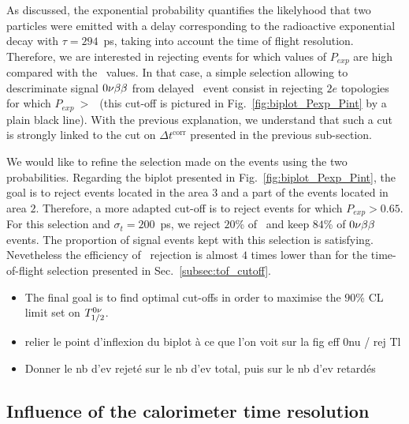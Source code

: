 As discussed, the exponential probability quantifies the likelyhood that two particles were emitted with a delay corresponding to the radioactive exponential decay with ${\tau=294}$~ps, taking into account the time of flight resolution.
Therefore, we are interested in rejecting events for which values of $P_{exp}$ are high compared with the \Pint\ values.
In that case, a simple selection allowing to descriminate signal $0\nu\beta\beta$ from delayed \Tl\ event consist in rejecting $2e$ topologies for which $P_{exp}~>~$\Pint\ (this cut-off is pictured in Fig.~\ref{fig:biplot_Pexp_Pint} by a plain black line).
With the previous explanation, we understand that such a cut is strongly linked to the cut on $\Delta t^{\text{corr}}$ presented in the previous sub-section.

We would like to refine the selection made on the events using the two probabilities.
Regarding the biplot presented in Fig.~\ref{fig:biplot_Pexp_Pint}, the goal is to reject events located in the area $3$ and a part of the events located in area $2$.
Therefore, a more adapted cut-off is to reject events for which ${P_{exp}>0.65}$.
For this selection and ${\sigma_{t}=200}$~ps, we reject $20$\% of \Tl\ and keep $84$\% of $0\nu\beta\beta$ events.
The proportion of signal events kept with this selection is satisfying.
Nevetheless the efficiency of \Tl\ rejection is almost $4$ times lower than for the time-of-flight selection presented in Sec.~\ref{subsec:tof_cutoff}.




\begin{itemize}
\item The final goal is to find optimal cut-offs in order to maximise the $90$\% CL limit set on $T_{1/2}^{0\nu}$.
\item relier le point d'inflexion du biplot à ce que l'on voit sur la fig eff 0nu / rej Tl
\item Donner le nb d'ev rejeté sur le nb d'ev total, puis sur le nb d'ev retardés
\end{itemize}


\subsection{Influence of the calorimeter time resolution}
\label{subsec:calo_sigma}


